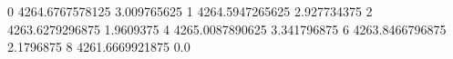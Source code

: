 0 4264.6767578125 3.009765625
1 4264.5947265625 2.927734375
2 4263.6279296875 1.9609375
4 4265.0087890625 3.341796875
6 4263.8466796875 2.1796875
8 4261.6669921875 0.0
